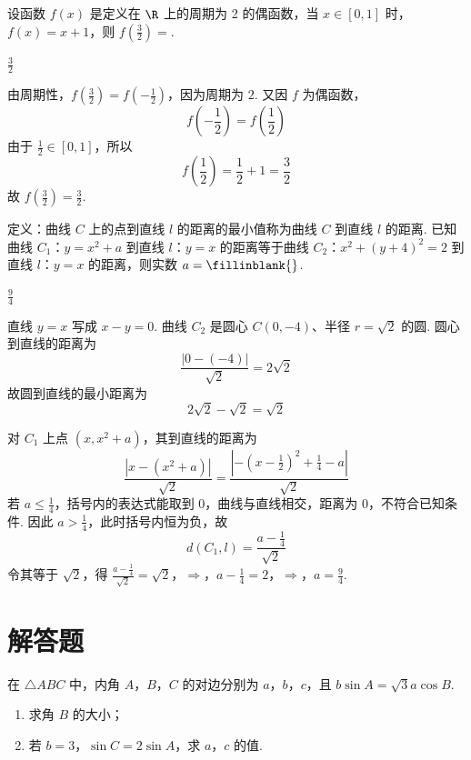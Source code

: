 \begin{problem}
设函数 \( f(x) \) 是定义在 \( \R \) 上的周期为 2 的偶函数，当 \( x \in [0,1] \) 时，\( f(x) = x + 1 \)，则 \( f\left(\frac{3}{2}\right) = \)\fillinblank{}.
\end{problem}

\begin{answer}
\(\frac{3}{2}\)
\end{answer}

\begin{solution}
由周期性，\(f(\frac{3}{2})=f(-\frac{1}{2})\)，因为周期为 \(2\). 又因 \(f\) 为偶函数，
\[
f\left(-\frac12\right)=f\left(\frac12\right)
\]
由于 \(\frac{1}{2}\in[0,1]\)，所以
\[
f\left(\frac12\right)=\frac12+1=\frac32
\]
故 \(f(\frac{3}{2})=\frac{3}{2}\).
\end{solution}

\begin{problem}
定义：曲线 \(C\) 上的点到直线 \(l\) 的距离的最小值称为曲线 \(C\) 到直线 \(l\) 的距离. 已知曲线 \(C_1\)：\(y = x^{2} + a\) 到直线 \(l\)：\(y = x\) 的距离等于曲线 \(C_2\)：\(x^{2} + (y + 4)^{2} = 2\) 到直线 \(l\)：\(y = x\) 的距离，则实数 \(a =\fillinblank{}\).
\end{problem}

\begin{answer}
\(\frac{9}{4}\)
\end{answer}

\begin{solution}
直线 \(y=x\) 写成 \(x-y=0\). 曲线 \(C_2\) 是圆心 \(C(0,-4)\)、半径 \(r=\sqrt2\) 的圆. 圆心到直线的距离为
\[
\frac{|0-(-4)|}{\sqrt2}=2\sqrt2
\]
故圆到直线的最小距离为
\[
2\sqrt2-\sqrt2=\sqrt2
\]

对 \(C_1\) 上点 \((x,x^2+a)\)，其到直线的距离为
\[
\frac{|x-(x^2+a)|}{\sqrt2}
=\frac{|-\left(x-\frac12\right)^2+\frac14-a|}{\sqrt2}
\]
若 \(a\leq\frac{1}{4}\)，括号内的表达式能取到 \(0\)，曲线与直线相交，距离为 \(0\)，不符合已知条件. 因此 \(a>\frac{1}{4}\)，此时括号内恒为负，故
\[
d(C_1,l)=\frac{a-\frac14}{\sqrt2}
\]
令其等于 \(\sqrt2\)，得
\(\frac{a-\frac14}{\sqrt2}=\sqrt2\)，\(\Longrightarrow\)，\(a-\frac14=2\)，\(\Longrightarrow\)，\(a=\frac94\).
\end{solution}

\section{解答题}

\begin{problem}
在 \(\triangle ABC\) 中，内角 \(A\)，\(B\)，\(C\) 的对边分别为 \(a\)，\(b\)，\(c\)，且 \(b \sin A = \sqrt{3} a \cos B\).

\begin{enumerate}
\item 求角 \(B\) 的大小；
\item 若 \(b = 3\)，\( \sin C = 2 \sin A \)，求 \(a\)，\(c\) 的值.
\end{enumerate}
\end{problem}

